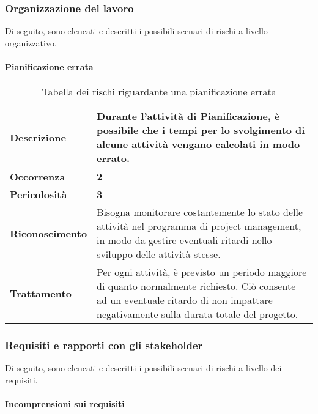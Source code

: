 \subsubsection{Organizzazione del lavoro}

Di seguito, sono elencati e descritti i possibili scenari di rischi a livello organizzativo.

\paragraph{Pianificazione errata}

\begin{table}[H]
	\begin{center}
		\begin{tabular}{|l | p{11cm}|}
			\hline
			\textbf{Descrizione}	& Durante l'attività di Pianificazione, è possibile che i tempi per lo svolgimento di alcune attività vengano calcolati in modo errato. \\
			\hline
			\textbf{Occorrenza}	&	\textbf{2}	\\
			\hline
			\textbf{Pericolosità}	&	\textbf{3}	\\
			\hline
			\textbf{Riconoscimento}	&	Bisogna monitorare costantemente lo stato delle attività nel programma di project management, in modo da gestire eventuali ritardi nello sviluppo delle attività stesse.	\\
			\hline
			\textbf{Trattamento}	&	Per ogni attività, è previsto un periodo maggiore di quanto normalmente richiesto. Ciò consente ad un eventuale ritardo di non impattare negativamente sulla durata totale del progetto.	\\
			\hline
		\end{tabular}
		\caption{Tabella dei rischi riguardante una pianificazione errata}
	\end{center}
\end{table}

\subsubsection{Requisiti e rapporti con gli stakeholder}

Di seguito, sono elencati e descritti i possibili scenari di rischi a livello dei requisiti.

\paragraph{Incomprensioni sui requisiti}

